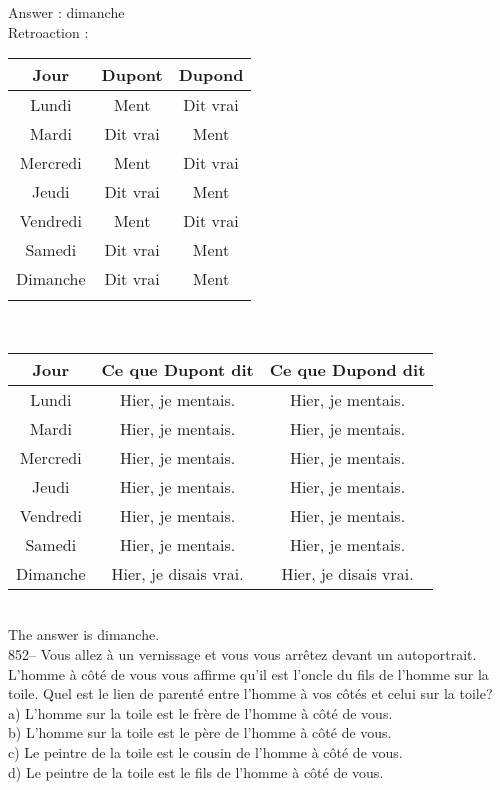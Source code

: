 ﻿\documentclass[letterpaper, 12pt]{article}
\begin{document}
Answer : dimanche\\

Retroaction : \\
\begin{tabular}{|c|c|c|} \hline
{\bf Jour} & {\bf Dupont} & {\bf Dupond} \\ \hline \hline

Lundi     & Ment  &  Dit vrai      \\ \hline
Mardi     & Dit vrai      &  Ment  \\ \hline
Mercredi  & Ment  &  Dit vrai      \\ \hline
Jeudi     & Dit vrai      &  Ment  \\ \hline
Vendredi  & Ment  &  Dit vrai      \\ \hline
Samedi    & Dit vrai      &  Ment  \\ \hline
Dimanche  & Dit vrai  &  Ment      \\ \hline
\multicolumn{3}{c}{}\\
\end{tabular}\\

\begin{tabular}{|c|c|c|} \hline
{\bf Jour} & {\bf Ce que Dupont dit } & {\bf Ce que Dupond dit } \\ \hline
\hline

Lundi     & Hier, je mentais.       &  Hier, je mentais.   \\ \hline
Mardi     & Hier, je mentais.      &  Hier, je mentais.       \\
\hline Mercredi  & Hier, je mentais.      &  Hier, je mentais.
\\ \hline Jeudi     & Hier, je mentais.      &  Hier, je mentais.
\\ \hline Vendredi  & Hier, je mentais.      &  Hier, je mentais.
\\ \hline Samedi    & Hier, je mentais.      &  Hier, je mentais.
\\ \hline Dimanche  & Hier, je disais vrai.  &  Hier, je disais
vrai.       \\ \hline
\end{tabular}\\

The answer is dimanche.  \\

852-- Vous allez \`a un vernissage et vous vous arr\^etez devant un
autoportrait.  L'homme \`a c\^ot\'e de vous vous affirme qu'il est l'oncle
du fils de l'homme sur la toile.  Quel est le lien de parent\'e entre
l'homme \`a vos c\^ot\'es et celui sur la toile?\\
a) L'homme sur la toile est le fr\`ere de l'homme \`a c\^ot\'e de vous.\\
b) L'homme sur la toile est le p\`ere de l'homme \`a c\^ot\'e de vous.\\
c) Le peintre de la toile est le cousin de l'homme \`a c\^ot\'e de vous.\\
d) Le peintre de la toile est le fils de l'homme \`a c\^ot\'e de vous.\\
\end{document}
